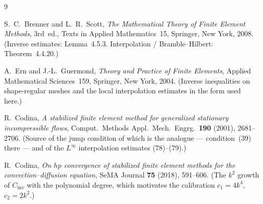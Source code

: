 \documentclass[11pt]{article}
\newcommand{\lbl}[1]{\texttt{\detokenize{#1}}}
\newcommand{\Cinv}{C_{\mathrm{inv}}}
\begin{document}
\begin{thebibliography}{9}

S.~C.~Brenner and L.~R.~Scott,
\emph{The Mathematical Theory of Finite Element Methods}, 3rd~ed.,
Texts in Applied Mathematics~15, Springer, New York, 2008.
\newblock (Inverse estimates: Lemma~4.5.3. Interpolation / Bramble--Hilbert:
Theorem~4.4.20.)

A.~Ern and J.-L.~Guermond,
\emph{Theory and Practice of Finite Elements},
Applied Mathematical Sciences~159, Springer, New York, 2004.
\newblock (Inverse inequalities on shape-regular meshes and the local
interpolation estimates in the form used here.)

R.~Codina,
\emph{A stabilized finite element method for generalized stationary
incompressible flows},
Comput.\ Methods Appl.\ Mech.\ Engrg.\ \textbf{190} (2001), 2681--2706.
\newblock (Source of the jump condition of which \lbl{H:jump} is the analogue
--- condition~(39) there --- and of the $L^\infty$ interpolation estimates
(78)--(79).)

R.~Codina,
\emph{On $hp$ convergence of stabilized finite element methods for the
convection--diffusion equation},
SeMA Journal \textbf{75} (2018), 591--606.
\newblock (The $k^2$ growth of $\Cinv$ with the polynomial degree, which
motivates the calibration $c_1=4k^4$, $c_2=2k^2$.)

\end{thebibliography}
\end{document}
